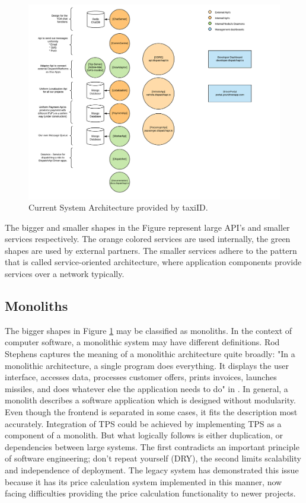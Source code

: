 \begin{figure}[H]
	\centering
	\includegraphics[width=1\textwidth]{Architecture}
	\caption[Current System Architecture]{Current System Architecture provided by taxiID.}
	\label{fig:Architecture}
\end{figure}

The bigger and smaller shapes in the Figure represent large API's and smaller services respectively. The orange colored services are used internally, the green shapes are used by external partners. The smaller services adhere to the pattern that is called service-oriented architecture, where application components provide services over a network typically.

\subsection{Monoliths}
The bigger shapes in Figure \ref{fig:Architecture} may be classified as monoliths. In the context of computer software, a monolithic system may have different definitions. Rod Stephens captures the meaning of a monolithic architecture quite broadly: "In a monolithic architecture, a single program does everything. It displays the user interface, accesses data, processes customer offers, prints invoices, launches missiles, and does whatever else the application needs to do" in \cite{rod-BSE}. In general, a monolith describes a software application which is designed without modularity. Even though the frontend is separated in some cases, it fits the description most accurately. Integration of TPS could be achieved by implementing TPS as a component of a monolith. But what logically follows is either duplication, or dependencies between large systems. The first contradicts an important principle of software engineering; don't repeat yourself (DRY), the second limits scalability and independence of deployment. The legacy system has demonstrated this issue because it has its price calculation system implemented in this manner, now facing difficulties providing the price calculation functionality to newer projects.

